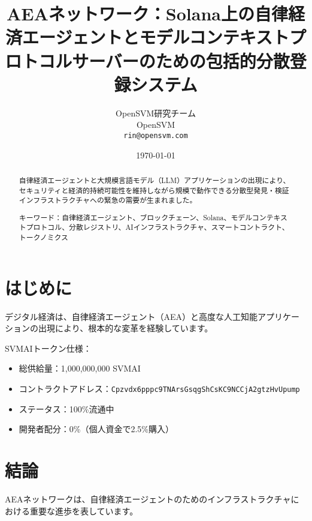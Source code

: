 \documentclass[12pt,a4paper]{article}
\title{AEAネットワーク：Solana上の自律経済エージェントとモデルコンテキストプロトコルサーバーのための包括的分散登録システム}
\author{OpenSVM研究チーム \\ OpenSVM \\ \texttt{rin@opensvm.com}}
\date{\today}
\begin{document}
\maketitle

\begin{abstract}
自律経済エージェントと大規模言語モデル（LLM）アプリケーションの出現により、セキュリティと経済的持続可能性を維持しながら規模で動作できる分散型発見・検証インフラストラクチャへの緊急の需要が生まれました。

キーワード：自律経済エージェント、ブロックチェーン、Solana、モデルコンテキストプロトコル、分散レジストリ、AIインフラストラクチャ、スマートコントラクト、トークノミクス
\end{abstract}

\section{はじめに}
デジタル経済は、自律経済エージェント（AEA）と高度な人工知能アプリケーションの出現により、根本的な変革を経験しています。

SVMAIトークン仕様：
\begin{itemize}
\item 総供給量：1,000,000,000 SVMAI
\item コントラクトアドレス：\texttt{Cpzvdx6pppc9TNArsGsqgShCsKC9NCCjA2gtzHvUpump}
\item ステータス：100\%流通中
\item 開発者配分：0\%（個人資金で2.5\%購入）
\end{itemize}

\section{結論}
AEAネットワークは、自律経済エージェントのためのインフラストラクチャにおける重要な進歩を表しています。
\end{document}
